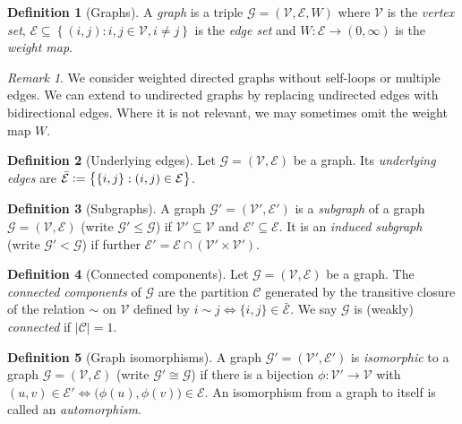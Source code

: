 \documentclass[12pt,draft]{ociamthesis}
\theoremstyle{plain}
\theoremstyle{definition}
\newtheorem{definition}{Definition}[chapter]
\theoremstyle{remark}
\newtheorem*{remark}{Remark}
\newcommand\ca[1]{\mathcal{#1}}
\begin{document}
\begin{definition}[Graphs]
  A \emph{graph} is a triple $\ca{G} = (\ca{V,E},W)$ where $\ca{V}$ is the
  \emph{vertex set}, $\ca{E} \subseteq \left\{ (i,j) : i,j \in \ca{V}, i \neq j
  \right\}$ is the \emph{edge set} and $W\colon \ca{E} \to (0,\infty)$ is the
  \emph{weight map}.
\end{definition}

\begin{remark}
  We consider weighted directed graphs without self-loops or multiple edges. We
  can extend to undirected graphs by replacing undirected edges with
  bidirectional edges. Where it is not relevant, we may sometimes omit the
  weight map $W$.
\end{remark}

\begin{definition}[Underlying edges]
  Let $\ca{G} = (\ca{V,E})$ be a graph. Its \emph{underlying edges} are
  $\bar{\ca{E}} \vcentcolon = \big\{ \{i,j\} : (i,j) \in \ca{E} \big\}$.
\end{definition}

\begin{definition}[Subgraphs]
  A graph $\ca{G'} = (\ca{V',E'})$ is a \emph{subgraph} of a graph $\ca{G} =
  (\ca{V,E})$ (write $\ca{G'} \leq \ca{G}$) if $\ca{V'} \subseteq \ca{V}$ and
  $\ca{E'} \subseteq \ca{E}$. It is an \emph{induced subgraph} (write $\ca{G'}
  < \ca{G}$) if further $\ca{E'} = \ca{E} \cap ( \ca{V'} \times \ca{V'} )$.
\end{definition}

\begin{definition}[Connected components]
  Let $\ca{G} = (\ca{V,E})$ be a graph. The \emph{connected components} of
  $\ca{G}$ are the partition $\ca{C}$ generated by the transitive closure of
  the relation $\sim$ on $\ca{V}$ defined by $i \sim j \iff \{i,j\} \in
  \bar{\ca{E}}$. We say $\ca{G}$ is (weakly) \emph{connected} if $|\ca{C}| =
  1$.
\end{definition}

\begin{definition}[Graph isomorphisms]
  A graph $\ca{G'} = (\ca{V',E'})$ is \emph{isomorphic} to a graph $\ca{G} =
  (\ca{V,E})$ (write $\ca{G'} \cong \ca{G}$) if there is a bijection
  $\phi\colon \ca{V'} \rightarrow \ca{V}$ with $(u,v) \in \ca{E'} \iff
  \big(\phi(u), \phi(v) \big) \in \ca{E}$.
  An isomorphism from a graph to itself is called an \emph{automorphism}.
\end{definition}
\end{document}
